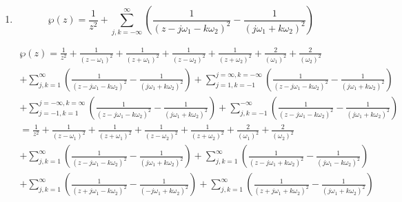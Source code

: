 \documentclass[a4paper]{article}
\begin{document}
\begin{enumerate}
\begin{enumerate}
		\item
		\[	\wp(z)=\frac{1}{z^2}+\sum_{j,k=-\infty}^\infty \left(\frac{1}{(z-j
			\omega_1-k \omega_2)^2}-\frac{1}{(j \omega_1+k \omega_2)^2}\right)\]
		                         	\begin{center}             
		                         		\begin{gather*}
	\wp(z)	=\frac{1}{z^2}+ \frac{1}{(z- \omega_1)^2}+ \frac{1}{(z+ \omega_1)^2}+ \frac{1}{(z- \omega_2)^2}+ \frac{1}{(z+ \omega_2)^2}+ \frac{2}{( \omega_1)^2} + \frac{2}{(\omega_2)^2}
	 \\ +\sum_{j,k=1}^\infty \left(\frac{1}{(z-j
				\omega_1-k \omega_2)^2}-\frac{1}{(j \omega_1+k \omega_2)^2}\right)		+ \sum_{j=1,k=-1}^{j=\infty,k=-\infty} \left(\frac{1}{(z-j	\omega_1-k \omega_2)^2}-\frac{1}{(j \omega_1+k \omega_2)^2}\right)\\	+\sum_{j=-1,k=1}^{j=-\infty,k=\infty} \left(\frac{1}{(z-j	\omega_1-k \omega_2)^2}-\frac{1}{(j \omega_1+k \omega_2)^2}\right)		+ \sum_{j,k=-1}^{-\infty} \left(\frac{1}{(z-j
		\omega_1-k \omega_2)^2}-\frac{1}{(j \omega_1+k \omega_2)^2}\right)		
		\\		=\frac{1}{z^2}+ \frac{1}{(z- \omega_1)^2}+ \frac{1}{(z+ \omega_1)^2}+ \frac{1}{(z- \omega_2)^2}+ \frac{1}{(z+ \omega_2)^2}+ \frac{2}{( \omega_1)^2} + \frac{2}{(\omega_2)^2}
		\\+\sum_{j,k=1}^\infty \left(\frac{1}{(z-j
			\omega_1-k \omega_2)^2}-\frac{1}{(j \omega_1+k \omega_2)^2}\right)		+ \sum_{j,k=1}^{\infty} \left(\frac{1}{(z-j
			\omega_1+k \omega_2)^2}-\frac{1}{(j \omega_1-k \omega_2)^2}\right)	
				\\+\sum_{j,k=1}^\infty \left(\frac{1}{(z+j
					\omega_1-k \omega_2)^2}-\frac{1}{(-j \omega_1+k \omega_2)^2}\right)		+ \sum_{j,k=1}^{\infty} \left(\frac{1}{(z+j
					\omega_1+k \omega_2)^2}-\frac{1}{(j \omega_1+k \omega_2)^2}\right)								\end{gather*} 
		\end{center}
			

\end{enumerate}
\end{enumerate}
\end{document}
